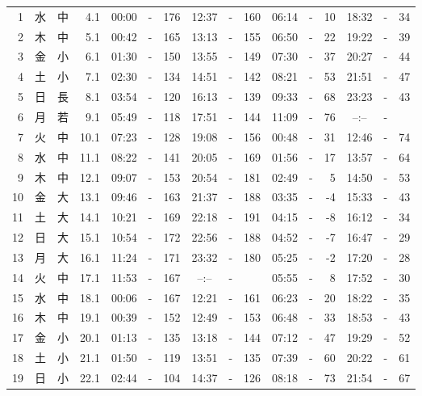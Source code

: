 \documentclass[12pt.a4j]{jsarticle}
\begin{document}
\begin{center}
\begin{table}[ht]
\begin{tabular}{|rc|cr|ccrccr|ccrccr|}
 \hline
 1 & 水 & 中 &  4.1 &  00:00 &-& 176  &  12:37 &-& 160  &   06:14 &-&  10  &   18:32 &-&  34  \\
 2 & 木 & 中 &  5.1 &  00:42 &-& 165  &  13:13 &-& 155  &   06:50 &-&  22  &   19:22 &-&  39  \\
 3 & 金 & 小 &  6.1 &  01:30 &-& 150  &  13:55 &-& 149  &   07:30 &-&  37  &   20:27 &-&  44  \\
 4 & 土 & 小 &  7.1 &  02:30 &-& 134  &  14:51 &-& 142  &   08:21 &-&  53  &   21:51 &-&  47  \\
 5 & 日 & 長 &  8.1 &  03:54 &-& 120  &  16:13 &-& 139  &   09:33 &-&  68  &   23:23 &-&  43  \\
 6 & 月 & 若 &  9.1 &  05:49 &-& 118  &  17:51 &-& 144  &   11:09 &-&  76  &   --:-- &-&     \\
 7 & 火 & 中 & 10.1 &  07:23 &-& 128  &  19:08 &-& 156  &   00:48 &-&  31  &   12:46 &-&  74  \\
 8 & 水 & 中 & 11.1 &  08:22 &-& 141  &  20:05 &-& 169  &   01:56 &-&  17  &   13:57 &-&  64  \\
 9 & 木 & 中 & 12.1 &  09:07 &-& 153  &  20:54 &-& 181  &   02:49 &-&   5  &   14:50 &-&  53  \\
10 & 金 & 大 & 13.1 &  09:46 &-& 163  &  21:37 &-& 188  &   03:35 &-&  -4  &   15:33 &-&  43  \\
11 & 土 & 大 & 14.1 &  10:21 &-& 169  &  22:18 &-& 191  &   04:15 &-&  -8  &   16:12 &-&  34  \\
12 & 日 & 大 & 15.1 &  10:54 &-& 172  &  22:56 &-& 188  &   04:52 &-&  -7  &   16:47 &-&  29  \\
13 & 月 & 大 & 16.1 &  11:24 &-& 171  &  23:32 &-& 180  &   05:25 &-&  -2  &   17:20 &-&  28  \\
14 & 火 & 中 & 17.1 &  11:53 &-& 167  &  --:-- &-&     &   05:55 &-&   8  &   17:52 &-&  30  \\
15 & 水 & 中 & 18.1 &  00:06 &-& 167  &  12:21 &-& 161  &   06:23 &-&  20  &   18:22 &-&  35  \\
16 & 木 & 中 & 19.1 &  00:39 &-& 152  &  12:49 &-& 153  &   06:48 &-&  33  &   18:53 &-&  43  \\
17 & 金 & 小 & 20.1 &  01:13 &-& 135  &  13:18 &-& 144  &   07:12 &-&  47  &   19:29 &-&  52  \\
18 & 土 & 小 & 21.1 &  01:50 &-& 119  &  13:51 &-& 135  &   07:39 &-&  60  &   20:22 &-&  61  \\
19 & 日 & 小 & 22.1 &  02:44 &-& 104  &  14:37 &-& 126  &   08:18 &-&  73  &   21:54 &-&  67  \\

\end{tabular}
\end{table}
\end{center}
\end{document}
